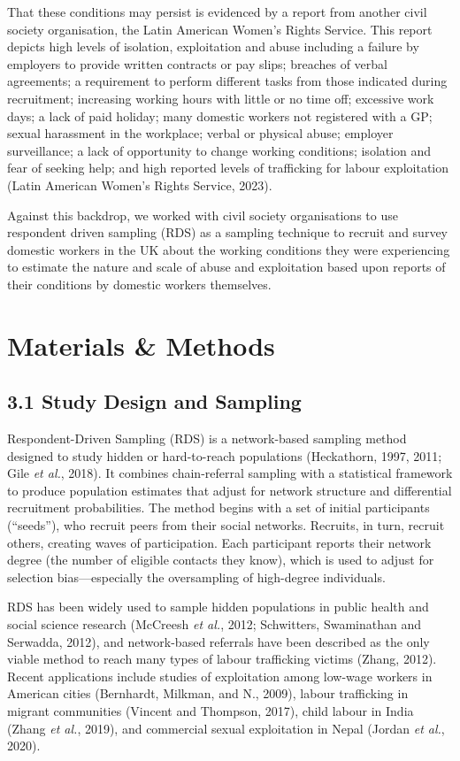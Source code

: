 \documentclass[
  12pt,
  letterpaper,
  DIV=11,
  numbers=noendperiod]{scrartcl}
\begin{document}
That these conditions may persist is evidenced by a report from another
civil society organisation, the Latin American Women's Rights Service.
This report depicts high levels of isolation, exploitation and abuse
including a failure by employers to provide written contracts or pay
slips; breaches of verbal agreements; a requirement to perform different
tasks from those indicated during recruitment; increasing working hours
with little or no time off; excessive work days; a lack of paid holiday;
many domestic workers not registered with a GP; sexual harassment in the
workplace; verbal or physical abuse; employer surveillance; a lack of
opportunity to change working conditions; isolation and fear of seeking
help; and high reported levels of trafficking for labour exploitation
(Latin American Women's Rights Service, 2023).

Against this backdrop, we worked with civil society organisations to use
respondent driven sampling (RDS) as a sampling technique to recruit and
survey domestic workers in the UK about the working conditions they were
experiencing to estimate the nature and scale of abuse and exploitation
based upon reports of their conditions by domestic workers themselves.

\section{Materials \& Methods}\label{materials-methods}

\subsection{3.1 Study Design and
Sampling}\label{study-design-and-sampling}

Respondent-Driven Sampling (RDS) is a network-based sampling method
designed to study hidden or hard-to-reach populations (Heckathorn, 1997,
2011; Gile \emph{et al.}, 2018). It combines chain-referral sampling
with a statistical framework to produce population estimates that adjust
for network structure and differential recruitment probabilities. The
method begins with a set of initial participants (``seeds''), who
recruit peers from their social networks. Recruits, in turn, recruit
others, creating waves of participation. Each participant reports their
network degree (the number of eligible contacts they know), which is
used to adjust for selection bias---especially the oversampling of
high-degree individuals.

RDS has been widely used to sample hidden populations in public health
and social science research (McCreesh \emph{et al.}, 2012; Schwitters,
Swaminathan and Serwadda, 2012), and network-based referrals have been
described as the only viable method to reach many types of labour
trafficking victims (Zhang, 2012). Recent applications include studies
of exploitation among low-wage workers in American cities (Bernhardt,
Milkman, and N., 2009), labour trafficking in migrant communities
(Vincent and Thompson, 2017), child labour in India (Zhang \emph{et
al.}, 2019), and commercial sexual exploitation in Nepal (Jordan
\emph{et al.}, 2020).
\end{document}
